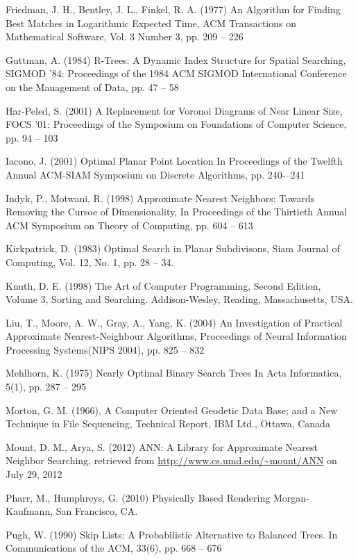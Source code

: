 \documentclass[mcs]{scsthesis}
\begin{document}
\begin{thebibliography}{5}
Friedman, J. H., Bentley, J. L., Finkel, R. A. (1977) An Algorithm for Finding
Best Matches in Logarithmic Expected Time, ACM Transactions on Mathematical
Software, Vol. 3 Number 3, pp. 209 -- 226

Guttman, A. (1984) R-Trees: A Dynamic Index Structure for Spatial Searching,
SIGMOD '84: Proceedings of the 1984 ACM SIGMOD International Conference on the
Management of Data, pp. 47 -- 58

Har-Peled, S. (2001) A Replacement for Voronoi Diagrams of Near Linear Size, 
FOCS '01: Proceedings of the Symposium on Foundations of Computer Science, 
pp. 94 -- 103

Iacono, J. (2001) Optimal Planar Point Location
In Proceedings of the Twelfth Annual ACM-SIAM Symposium on Discrete Algorithms,
pp. 240-–241

Indyk, P., Motwani, R. (1998) Approximate Nearest Neighbors: Towards Removing
the Cursoe of Dimensionality, In Proceedings of the Thirtieth Annual ACM
Symposium on Theory of Computing, pp. 604 -- 613 

Kirkpatrick, D. (1983) Optimal Search in Planar Subdivisons,
Siam Journal of Computing, Vol. 12, No. 1, pp. 28 -- 34.

Knuth, D. E. (1998) The Art of Computer Programming, Second Edition,
Volume 3, Sorting and Searching.  Addison-Wesley, Reading, Massachusetts, USA.

Liu, T., Moore, A. W., Gray, A., Yang, K. (2004) An Investigation of Practical
Approximate Nearest-Neighbour Algorithms, Proceedings of Neural Information
Processing Systems(NIPS 2004), pp. 825 -- 832 

Mehlhorn, K. (1975) Nearly Optimal Binary Search Trees 
In Acta Informatica, 5(1), pp. 287 – 295

Morton, G. M. (1966), A Computer Oriented Geodetic Data Base; and a New
Technique in File Sequencing, Technical Report, IBM Ltd., Ottawa, Canada

Mount, D. M., Arya, S. (2012) ANN: A Library for Approximate Nearest Neighbor
Searching, retrieved from \url{http://www.cs.umd.edu/~mount/ANN} on July 29, 2012 

Pharr, M., Humphreys, G. (2010) Physically Based Rendering
Morgan-Kaufmann, San Francisco, CA.  

Pugh, W. (1990) Skip Lists: A Probabilistic Alternative to Balanced Trees.
In Communications of the ACM, 33(6), pp. 668 – 676


\end{thebibliography}
\end{document}
